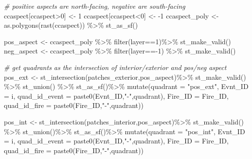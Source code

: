 \documentclass[
]{book}
\newenvironment{Shaded}{\begin{snugshade}}{\end{snugshade}}
\newcommand{\AttributeTok}[1]{\textcolor[rgb]{0.77,0.63,0.00}{#1}}
\newcommand{\CommentTok}[1]{\textcolor[rgb]{0.56,0.35,0.01}{\textit{#1}}}
\newcommand{\DecValTok}[1]{\textcolor[rgb]{0.00,0.00,0.81}{#1}}
\newcommand{\FunctionTok}[1]{\textcolor[rgb]{0.00,0.00,0.00}{#1}}
\newcommand{\NormalTok}[1]{#1}
\newcommand{\OtherTok}[1]{\textcolor[rgb]{0.56,0.35,0.01}{#1}}
\newcommand{\SpecialCharTok}[1]{\textcolor[rgb]{0.00,0.00,0.00}{#1}}
\newcommand{\StringTok}[1]{\textcolor[rgb]{0.31,0.60,0.02}{#1}}
\begin{document}
\begin{Shaded}
\begin{Highlighting}[]
  \CommentTok{\# positive aspects are north{-}facing, negative are south{-}facing}
\NormalTok{  ccaspect[ccaspect}\SpecialCharTok{\textgreater{}}\DecValTok{0}\NormalTok{] }\OtherTok{\textless{}{-}} \DecValTok{1}
\NormalTok{  ccaspect[ccaspect}\SpecialCharTok{\textless{}}\DecValTok{0}\NormalTok{] }\OtherTok{\textless{}{-}} \SpecialCharTok{{-}}\DecValTok{1}
\NormalTok{  ccaspect\_poly }\OtherTok{\textless{}{-}} \FunctionTok{as.polygons}\NormalTok{(}\FunctionTok{rast}\NormalTok{(ccaspect)) }\SpecialCharTok{\%\textgreater{}\%}
    \FunctionTok{st\_as\_sf}\NormalTok{()}
  
\NormalTok{  pos\_aspect }\OtherTok{\textless{}{-}}\NormalTok{ ccaspect\_poly }\SpecialCharTok{\%\textgreater{}\%}
    \FunctionTok{filter}\NormalTok{(layer}\SpecialCharTok{==}\DecValTok{1}\NormalTok{)}\SpecialCharTok{\%\textgreater{}\%} 
    \FunctionTok{st\_make\_valid}\NormalTok{()}
\NormalTok{  neg\_aspect }\OtherTok{\textless{}{-}}\NormalTok{ ccaspect\_poly }\SpecialCharTok{\%\textgreater{}\%}
    \FunctionTok{filter}\NormalTok{(layer}\SpecialCharTok{=={-}}\DecValTok{1}\NormalTok{) }\SpecialCharTok{\%\textgreater{}\%} 
    \FunctionTok{st\_make\_valid}\NormalTok{()}

  \CommentTok{\# get quadrants as the intersection of interior/exterior and pos/neg aspect}
\NormalTok{  pos\_ext }\OtherTok{\textless{}{-}} \FunctionTok{st\_intersection}\NormalTok{(patches\_exterior,pos\_aspect)}\SpecialCharTok{\%\textgreater{}\%} 
    \FunctionTok{st\_make\_valid}\NormalTok{() }\SpecialCharTok{\%\textgreater{}\%} 
    \FunctionTok{st\_union}\NormalTok{() }\SpecialCharTok{\%\textgreater{}\%} 
    \FunctionTok{st\_as\_sf}\NormalTok{()}\SpecialCharTok{\%\textgreater{}\%} 
    \FunctionTok{mutate}\NormalTok{(}\AttributeTok{quadrant =} \StringTok{"pos\_ext"}\NormalTok{,}
           \AttributeTok{Evnt\_ID =}\NormalTok{ i,}
           \AttributeTok{quad\_id\_event =} \FunctionTok{paste0}\NormalTok{(Evnt\_ID,}\StringTok{"{-}"}\NormalTok{,quadrant),}
           \AttributeTok{Fire\_ID =}\NormalTok{ Fire\_ID,}
           \AttributeTok{quad\_id\_fire =} \FunctionTok{paste0}\NormalTok{(Fire\_ID,}\StringTok{"{-}"}\NormalTok{,quadrant))}

\NormalTok{  pos\_int }\OtherTok{\textless{}{-}} \FunctionTok{st\_intersection}\NormalTok{(patches\_interior,pos\_aspect)}\SpecialCharTok{\%\textgreater{}\%} 
    \FunctionTok{st\_make\_valid}\NormalTok{() }\SpecialCharTok{\%\textgreater{}\%} 
    \FunctionTok{st\_union}\NormalTok{()}\SpecialCharTok{\%\textgreater{}\%} 
    \FunctionTok{st\_as\_sf}\NormalTok{()}\SpecialCharTok{\%\textgreater{}\%} 
    \FunctionTok{mutate}\NormalTok{(}\AttributeTok{quadrant =} \StringTok{"pos\_int"}\NormalTok{,}
           \AttributeTok{Evnt\_ID =}\NormalTok{ i,}
           \AttributeTok{quad\_id\_event =} \FunctionTok{paste0}\NormalTok{(Evnt\_ID,}\StringTok{"{-}"}\NormalTok{,quadrant),}
           \AttributeTok{Fire\_ID =}\NormalTok{ Fire\_ID,}
           \AttributeTok{quad\_id\_fire =} \FunctionTok{paste0}\NormalTok{(Fire\_ID,}\StringTok{"{-}"}\NormalTok{,quadrant))}
  

\end{Highlighting}
\end{Shaded}
\end{document}
